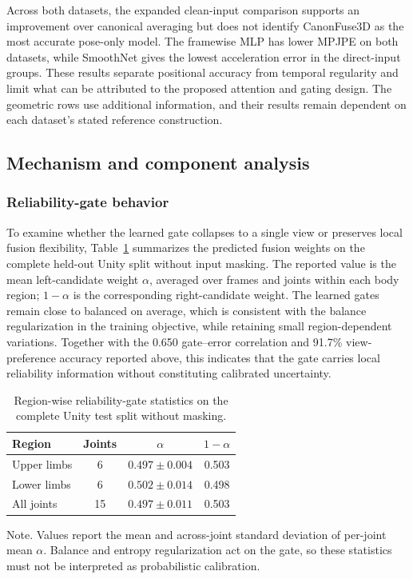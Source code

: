 \documentclass[preprint,12pt]{elsarticle}
\renewcommand{\textit}[1]{\textup{#1}}
\begin{document}


Across both datasets, the expanded clean-input comparison supports an improvement over canonical averaging but does not identify CanonFuse3D as the most accurate pose-only model. The framewise MLP has lower MPJPE on both datasets, while SmoothNet gives the lowest acceleration error in the direct-input groups. These results separate positional accuracy from temporal regularity and limit what can be attributed to the proposed attention and gating design. The geometric rows use additional information, and their results remain dependent on each dataset's stated reference construction.


\FloatBarrier
\subsection{Mechanism and component analysis}

\subsubsection{Reliability-gate behavior}

To examine whether the learned gate collapses to a single view or preserves local fusion flexibility, Table~\ref{tab:gate_region_summary} summarizes the predicted fusion weights on the complete held-out Unity split without input masking. The reported value is the mean left-candidate weight \(\alpha\), averaged over frames and joints within each body region; \(1-\alpha\) is the corresponding right-candidate weight. The learned gates remain close to balanced on average, which is consistent with the balance regularization in the training objective, while retaining small region-dependent variations. Together with the 0.650 gate--error correlation and 91.7\% view-preference accuracy reported above, this indicates that the gate carries local reliability information without constituting calibrated uncertainty.

\begin{table}[t]
\centering
\caption{Region-wise reliability-gate statistics on the complete Unity test split without masking.}
\label{tab:gate_region_summary}
\footnotesize
\setlength{\tabcolsep}{6pt}
\renewcommand{\arraystretch}{1.08}
\begin{tabular}{lccc}
\toprule
Region & Joints & \(\alpha\) & \(1-\alpha\) \\
\midrule
Upper limbs & 6 & \(0.497 \pm 0.004\) & 0.503 \\
Lower limbs & 6 & \(0.502 \pm 0.014\) & 0.498 \\
All joints & 15 & \(0.497 \pm 0.011\) & 0.503 \\
\bottomrule
\end{tabular}
\vspace{0.4em}
\begin{minipage}{0.94\linewidth}
\footnotesize
\textit{Note.} Values report the mean and across-joint standard deviation of per-joint mean \(\alpha\). Balance and entropy regularization act on the gate, so these statistics must not be interpreted as probabilistic calibration.
\end{minipage}
\end{table}
\end{document}

